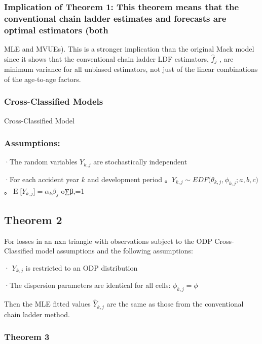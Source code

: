 \documentclass[
]{article}
\begin{document}
\subsubsection{Implication of Theorem 1: This theorem means that the
conventional chain ladder estimates and forecasts are optimal estimators
(both}\label{implication-of-theorem-1-this-theorem-means-that-the-conventional-chain-ladder-estimates-and-forecasts-are-optimal-estimators-both}

MLE and MVUEs). This is a stronger implication than the original Mack
model since it shows that the conventional chain ladder LDF estimators,
\(\hat{f}_{j}\) , are minimum variance for all unbiased estimators, not
just of the linear combinations of the age-to-age factors.

\subsubsection{Cross-Classified Models}\label{cross-classified-models}

Cross-Classified Model

\subsubsection{Assumptions:}\label{assumptions-2}

·The random variables \(Y_{k,j}\) are stochastically independent

·For each accident year \(k\) and development period
。\(Y_{k,j}\sim EDF\big(\theta_{k,j},\phi_{k,j};a,b,c\big)\)
。\(\operatorname{E}\biggl[Y_{k,j}\biggr]=\alpha_{k}\beta_{j}\) o∑β,=1

\subsection{Theorem 2}\label{theorem-2}

For losses in an nxn triangle with observations subject to the ODP
Cross-Classified model assumptions and the following assumptions:

· \(Y_{k,j}\) is restricted to an ODP distribution

·The dispersion parameters are identical for all cells:
\(\phi_{k,j}=\phi\)

Then the MLE fitted values \(\hat{Y}_{k,j}\) are the same as those from
the conventional chain ladder method.

\subsubsection{Theorem 3}\label{theorem-3}
\end{document}
